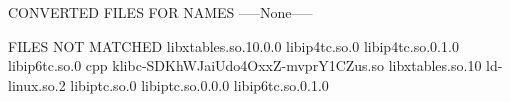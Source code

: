 
CONVERTED FILES FOR NAMES
-----None-----

FILES NOT MATCHED
libxtables.so.10.0.0
libip4tc.so.0
libip4tc.so.0.1.0
libip6tc.so.0
cpp
klibc-SDKhWJaiUdo4OxxZ-mvprY1CZus.so
libxtables.so.10
ld-linux.so.2
libiptc.so.0
libiptc.so.0.0.0
libip6tc.so.0.1.0
